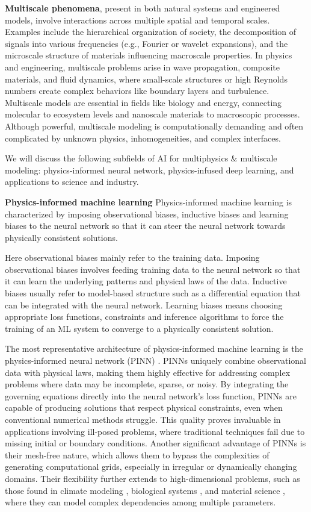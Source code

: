 \textbf{Multiscale phenomena}, present in both natural systems and engineered models, involve interactions across multiple spatial and temporal scales. Examples include the hierarchical organization of society, the decomposition of signals into various frequencies (e.g., Fourier or wavelet expansions), and the microscale structure of materials influencing macroscale properties. In physics and engineering, multiscale problems arise in wave propagation, composite materials, and fluid dynamics, where small-scale structures or high Reynolds numbers create complex behaviors like boundary layers and turbulence. Multiscale models are essential in fields like biology and energy, connecting molecular to ecosystem levels and nanoscale materials to macroscopic processes. Although powerful, multiscale modeling is computationally demanding and often complicated by unknown physics, inhomogeneities, and complex interfaces.

We will discuss the following subfields of AI for multiphysics \& multiscale modeling: physics-informed neural network, physics-infused deep learning, and applications to science and industry.

{\Large \textbf{Physics-informed machine learning}} 
Physics-informed machine learning is characterized by imposing observational biases, inductive biases and learning biases to the neural network so that it can steer the neural network towards physically consistent solutions.

Here observational biases mainly refer to the training data. Imposing observational biases involves feeding training data to the neural network so that it can learn the underlying patterns and physical laws of the data. Inductive biases usually refer to model-based structure such as a differential equation that can be integrated with the neural network. Learning biases means choosing appropriate loss functions, constraints and inference algorithms to force the training of an ML system to converge to a physically consistent solution. 

The most representative architecture of physics-informed machine learning is the physics-informed neural network (PINN) \cite{raissi2019physics}. PINNs uniquely combine observational data with physical laws, making them highly effective for addressing complex problems where data may be incomplete, sparse, or noisy. By integrating the governing equations directly into the neural network’s loss function, PINNs are capable of producing solutions that respect physical constraints, even when conventional numerical methods struggle. This quality proves invaluable in applications involving ill-posed problems, where traditional techniques fail due to missing initial or boundary conditions. Another significant advantage of PINNs is their mesh-free nature, which allows them to bypass the complexities of generating computational grids, especially in irregular or dynamically changing domains. Their flexibility further extends to high-dimensional problems, such as those found in climate modeling \cite{lutjens2021pce}, biological systems \cite{arzani2021uncovering}, and material science \cite{manav2024phase}, where they can model complex dependencies among multiple parameters.

